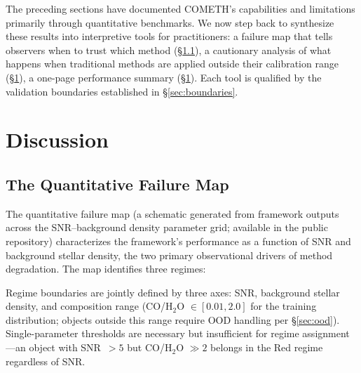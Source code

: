 \documentclass[usenatbib]{mnras}
\begin{document}
The preceding sections have documented COMETH's capabilities and limitations primarily through quantitative benchmarks. We now step back to synthesize these results into interpretive tools for practitioners: a failure map that tells observers when to trust which method (\S\ref{sec:failure_map}), a cautionary analysis of what happens when traditional methods are applied outside their calibration range (\S\ref{sec:discussion}), a one-page performance summary (\S\ref{sec:discussion}). Each tool is qualified by the validation boundaries established in \S\ref{sec:boundaries}.

\section{Discussion}\label{sec:discussion}

\subsection{The Quantitative Failure Map}\label{sec:failure_map}

The quantitative failure map (a schematic generated from framework outputs across the SNR--background density parameter grid; available in the public repository) characterizes the framework's performance as a function of SNR and background stellar density, the two primary observational drivers of method degradation. The map identifies three regimes:

Regime boundaries are jointly defined by three axes: SNR, background stellar density, and composition range (CO/H$_2$O $\in [0.01, 2.0]$ for the training distribution; objects outside this range require OOD handling per \S\ref{sec:ood}). Single-parameter thresholds are necessary but insufficient for regime assignment---an object with SNR~$>5$ but CO/H$_2$O $\gg 2$ belongs in the Red regime regardless of SNR.
\end{document}
